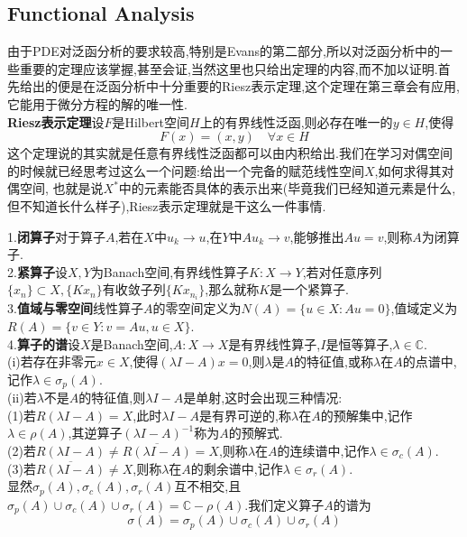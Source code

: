 \documentclass[a4paper,UTF8,12pt]{ctexart}
\begin{document}
\subsection{Functional Analysis}
由于PDE对泛函分析的要求较高,特别是Evans的第二部分,所以对泛函分析中的一些重要的定理应该掌握,甚至会证,当然这里也只给出定理的内容,而不加以证明.首先给出的便是在泛函分析中十分重要的Riesz表示定理,这个定理在第三章会有应用,它能用于微分方程的解的唯一性.\\
\textbf{Riesz表示定理}\quad 设$F$是Hilbert空间$H$上的有界线性泛函,则必存在唯一的$y\in H$,使得
$$
F(x) = (x,y)\quad \forall x\in H
$$
这个定理说的其实就是任意有界线性泛函都可以由内积给出.我们在学习对偶空间的时候就已经思考过这么一个问题:给出一个完备的赋范线性空间$X$,如何求得其对偶空间,
也就是说$X^*$中的元素能否具体的表示出来(毕竟我们已经知道元素是什么,但不知道长什么样子),Riesz表示定理就是干这么一件事情.\\
\begin{tcolorbox}[colback=red!5!white,colframe=gray!75!black,title=\textbf{一些基本概念的定义},sharpish corners]
    1.\textbf{闭算子}\quad 对于算子$A$,若在$X$中$u_k\to u$,在$Y$中$Au_k\to v$,能够推出$Au = v$,则称$A$为闭算子.\\
    2.\textbf{紧算子}\quad 设$X,Y$为Banach空间,有界线性算子$K:X\to Y$,若对任意序列$\{x_n\}\subset X,\{Kx_n\}$有收敛子列$\{Kx_{n_i}\}$,那么就称$K$是一个紧算子.\\
    3.\textbf{值域与零空间}\quad 线性算子$A$的零空间定义为$N(A) = \{u\in X:Au=0\}$,值域定义为$R(A) = \{v\in Y:v = Au,u\in X\}$.\\
    4.\textbf{算子的谱}\quad 设$X$是Banach空间,$A:X\to X$是有界线性算子,$I$是恒等算子,$\lambda\in\mathbb{C}$.\\
    (i)若存在非零元$x\in X$,使得$(\lambda I-A)x=0$,则$\lambda$是$A$的特征值,或称$\lambda$在$A$的点谱中,记作$\lambda\in\sigma _{p}(A)$.\\
    (ii)若$\lambda$不是$A$的特征值,则$\lambda I-A$是单射,这时会出现三种情况:\\
    (1)若$R(\lambda I-A)=X$,此时$\lambda I-A$是有界可逆的,称$\lambda$在$A$的预解集中,记作$\lambda\in\rho (A)$,其逆算子$(\lambda I-A)^{-1}$称为$A$的预解式.\\
    (2)若$R(\lambda I-A)\neq\overline{R(\lambda I-A)}=X$,则称$\lambda$在$A$的连续谱中,记作$\lambda\in \sigma _c(A)$.\\
    (3)若$\overline{R(\lambda I-A)}\neq X$,则称$\lambda$在$A$的剩余谱中,记作$\lambda\in\sigma _r(A)$.\\
    显然$\sigma _p(A),\sigma _c(A),\sigma _r(A)$互不相交,且$\sigma _p(A)\cup\sigma _c(A)\cup\sigma _r(A)=\mathbb{C}-\rho (A)$.我们定义算子$A$的谱为
    $$
    \sigma (A)=\sigma _p(A)\cup\sigma _c(A)\cup\sigma _r(A)
    $$
\end{tcolorbox}
\end{document}
